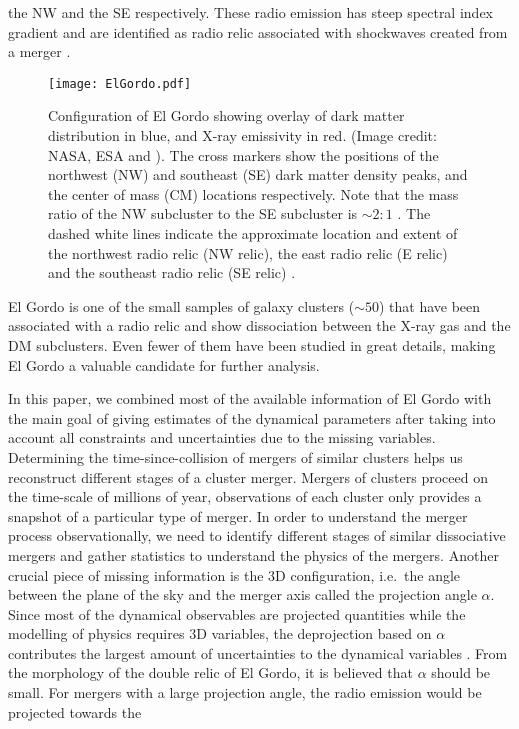 the NW and the SE respectively. These radio emission has steep spectral
index gradient and are identified as radio relic associated with shockwaves
created from a merger \citep{L13}. 
\begin{figure}
	\texttt{[image: ElGordo.pdf]}
	\caption{Configuration of El Gordo showing overlay of dark
		matter distribution in blue, and X-ray emissivity in red. 
		(Image credit: NASA, ESA and \citealt{Jee13}). 
		The cross markers show the positions of the northwest (NW) and
		southeast (SE) dark matter density peaks, and the center of mass (CM)
		locations respectively. Note that the mass ratio of the NW subcluster
		to the SE subcluster is $\sim 2:1$ \citep{Jee13}. 
		The dashed white lines indicate the approximate location and extent of the northwest radio relic (NW relic), the east radio relic (E relic) and the
		southeast radio relic (SE relic) \citep{L13}.
		\label{fig:config}}
\end{figure}
El Gordo is one of the small samples of galaxy clusters ($\sim50$) that have
been associated with a radio relic and show dissociation between the X-ray
gas and the DM subclusters. Even fewer of them have been studied in
great details, making El Gordo a valuable candidate for further analysis.\par 
In this paper, we combined most of the available information of El Gordo
with the main goal of giving estimates of
the dynamical parameters after taking into account all
constraints and uncertainties due to the missing variables.
Determining the time-since-collision of mergers of similar clusters helps
us reconstruct different stages of a cluster merger.
Mergers of clusters proceed on the time-scale of millions of year,
observations of each cluster only provides a snapshot of a particular type
of merger. In order to understand the merger process observationally, 
we need to identify different stages of similar dissociative mergers and
gather statistics to understand the physics of the mergers.  
Another crucial piece of missing information is the 3D
configuration, i.e.\ the angle between the plane of the sky and the merger
axis called the projection angle $\alpha$. Since most of the dynamical
observables are projected quantities while the modelling of physics
requires 3D
variables, the deprojection based on $\alpha$ contributes the
largest amount of uncertainties to the dynamical variables .
From the morphology of the double relic of El Gordo, it is believed that
$\alpha$ should be small. For mergers with a
large projection angle, the radio emission would be projected towards the
